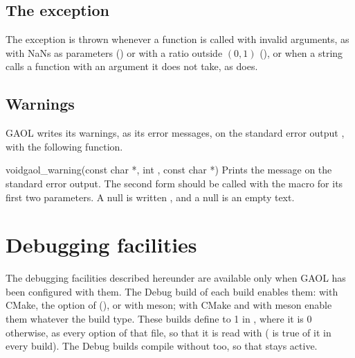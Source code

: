 \documentclass[12pt,a4paper,twoside,openright]{book}
\begin{document}
\subsection{The  exception}\label{sec:domain_error}

The exception  is thrown whenever a function is
called with invalid arguments, as  with NaNs as
parameters () or  with a ratio outside
$(0, 1)$ (), or when a string calls a function with an
argument it does not take, as  does.

\subsection{Warnings}\label{sec:warnings}
%

GAOL writes its warnings, as its error messages, on the standard error
output , with the following function.

\begin{deffun}{void}{gaol\_warning}{(const char *, int , const char *)}
Prints the message  on the standard error output. The second form
should be called with the macro  for its first two
parameters. A null  is written , and a null
 is an empty text.\newinvfive
\end{deffun}

\section{Debugging facilities}\label{sec:debugging-facilities}
%

The debugging facilities described hereunder are available only when GAOL
has been configured with them. The Debug build of each build enables them:
 with CMake, the option
 of  (), or
 with meson;  with CMake
and  with meson enable them whatever the build
type.\newinvfive{} These builds define  to 1 in
, where it is 0 otherwise, as every option
of that file, so that it is read with  ( is true of
it in every build). The Debug builds compile without  too, so
that  stays active.\newinvfive
\end{document}
